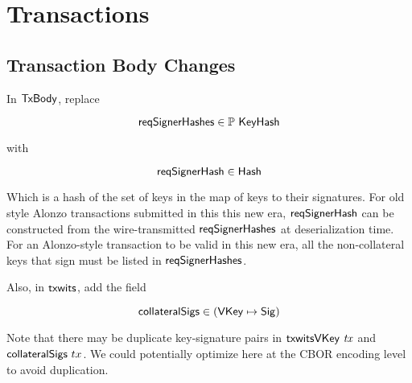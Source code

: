 \section{Transactions}
\label{sec:transactions}

\subsection{Transaction Body Changes}

In $\mathsf{TxBody}$, replace

\[\mathsf{reqSignerHashes} \in \mathbb{P}~\mathsf{KeyHash} \]

with

\[ \mathsf{reqSignerHash} \in \mathsf{Hash} \]

Which is a hash of the set of keys in the map of keys to their signatures.
For old style Alonzo transactions submitted in this this new era,
$\mathsf{reqSignerHash}$ can be constructed from the wire-transmitted $\mathsf{reqSignerHashes}$
at deserialization time. For an Alonzo-style transaction to be valid in this new era,
all the non-collateral keys that sign must be listed in $\mathsf{reqSignerHashes}$.

Also, in $\mathsf{txwits}$, add the field

\[\mathsf{collateralSigs} \in (\mathsf{VKey} \mapsto \mathsf{Sig})\]

Note that there may be duplicate key-signature pairs in $\mathsf{txwitsVKey}~\mathit{tx}$
and $\mathsf{collateralSigs}~{tx}$. We could potentially optimize here at the CBOR
encoding level to avoid duplication.
